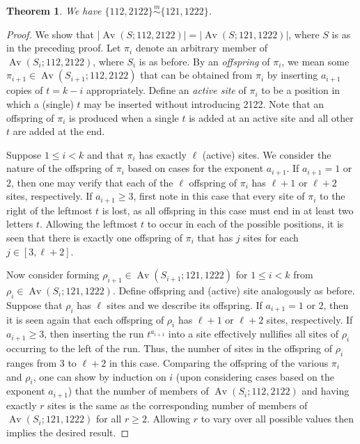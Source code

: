 \documentclass[11pt]{amsart}
\theoremstyle{plain}
\newtheorem{theorem}{Theorem}[section]
\theoremstyle{definition}
\newcommand{\csim}{\stackrel{m}{\sim}}
\DeclareMathOperator{\Av}{Av}
\begin{document}
\begin{theorem}\label{112,2122}
 We have $\{112,2122\}\csim\{121,1222\}$.
\end{theorem}
\begin{proof}
We show that $|\Av(S;112,2122)|=|\Av(S;121,1222)|$, where $S$ is as in the preceding proof.  Let
$\pi_i$ denote an arbitrary member of $\Av(S_i;112,2122)$, where $S_i$ is as before.   By an
\emph{offspring} of $\pi_i$, we mean some $\pi_{i+1} \in \Av(S_{i+1};112,2122)$ that can be
obtained from $\pi_i$ by inserting $a_{i+1}$ copies of $t=k-i$ appropriately.  Define an \emph{active
site} of $\pi_i$ to be a position in which a (single) $t$ may be inserted without introducing 2122.
Note that an offspring of $\pi_i$ is produced when a single $t$ is added at an active site and all
other $t$ are added at the end.

Suppose $1 \leq i <k$ and that $\pi_i$ has exactly $\ell$ (active) sites.  We consider the nature of
the offspring of $\pi_i$ based on cases for the exponent $a_{i+1}$.  If $a_{i+1}=1$ or $2$, then one
may verify that each of the $\ell$ offspring of $\pi_i$ has $\ell+1$ or $\ell+2$ sites, respectively.
 If $a_{i+1}\geq 3$, first note in this case that every site of $\pi_i$ to the right of the leftmost
$t$ is lost, as all offspring in this case must end in at least two letters $t$.  Allowing the
leftmost $t$ to occur in each of the possible positions, it is seen that there is exactly one
offspring of $\pi_i$ that has $j$ sites for each $j \in [3,\ell+2]$.

Now consider forming $\rho_{i+1}\in \Av(S_{i+1};121,1222)$ for $1 \leq i <k$ from $\rho_{i}\in
\Av(S_{i};121,1222)$.  Define offspring and (active) site analogously as before.  Suppose that
$\rho_i$ has $\ell$ sites and we describe its offspring.  If $a_{i+1}=1$ or $2$, then it is seen
again that each offspring of $\rho_i$ has $\ell+1$ or $\ell+2$ sites, respectively.  If $a_{i+1}\geq
3$, then inserting the run $t^{a_{i+1}}$ into a site effectively nullifies all sites of $\rho_i$
occurring to the left of the run. Thus, the number of sites in the offspring of $\rho_i$ ranges from
$3$ to $\ell+2$ in this case.  Comparing the offspring of the various $\pi_i$ and $\rho_i$, one can
show by induction on $i$ (upon considering cases based on the exponent $a_{i+1}$) that the number of
members of $\Av(S_i;112,2122)$ and having exactly $r$ sites is the same as the corresponding number
of members of  $\Av(S_i;121,1222)$ for all $r \geq 2$.  Allowing $r$ to vary over all possible
values then implies the desired result.
\end{proof}
\end{document}

